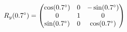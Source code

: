 \documentclass[preview]{standalone}
\begin{document}
\begin{align*}
\special{dvisvgm:raw <g id='unique000'>}R_y(0.7^\circ) = \begin{pmatrix} \cos(0.7^\circ) & 0 & -\sin(0.7^\circ) \\ 0 & 1 & 0 \\ \sin(0.7^\circ) & 0 & \cos(0.7^\circ) \end{pmatrix}\special{dvisvgm:raw </g>}
\end{align*}
\end{document}
